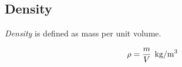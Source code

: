 \subsection{Density}\label{subsec:Density}
\begin{definition}[Density]\label{def:Density}
  \emph{Density} is defined as mass per unit volume.

  \begin{equation}\label{eq:Density}
    \Density = \frac{\Mass}{\Volume} \:\: \si[per-mode=symbol]{\kilo\gram\per\meter\cubed}
  \end{equation}
\end{definition}


